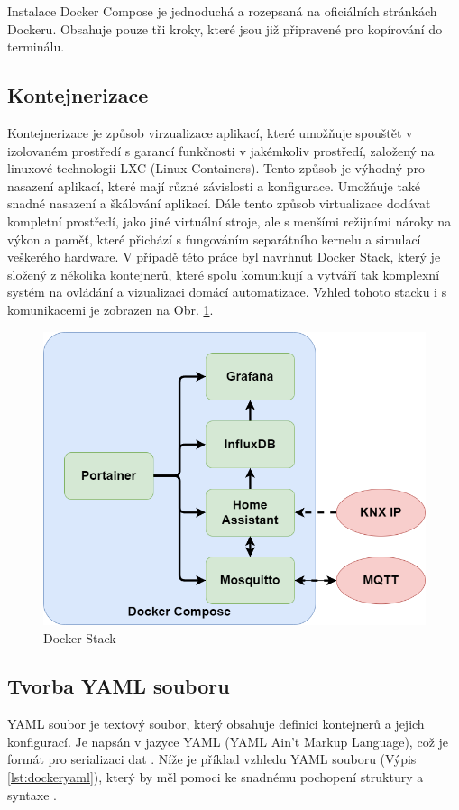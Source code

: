 Instalace Docker Compose je jednoduchá a rozepsaná na oficiálních stránkách Dockeru. Obsahuje pouze tři kroky, které jsou již připravené pro kopírování do terminálu. \cite{DockerInstallationForDebian}

\subsection{Kontejnerizace}
Kontejnerizace je způsob virzualizace aplikací, které umožňuje spouštět v izolovaném prostředí s garancí funkčnosti v jakémkoliv prostředí, založený na linuxové technologii LXC (Linux Containers). Tento způsob je výhodný pro nasazení aplikací, které mají různé závislosti a konfigurace. Umožňuje také snadné nasazení a škálování aplikací. Dále tento způsob virtualizace dodávat kompletní prostředí, jako jiné virtuální stroje, ale s menšími režijními nároky na výkon a paměť, které přichází s fungováním separátního kernelu a simulací veškerého hardware. \cite{ContainerAndVirtualization}
V případě této práce byl navrhnut Docker Stack, který je složený z několika kontejnerů, které spolu komunikují a vytváří tak komplexní systém na ovládání a vizualizaci domácí automatizace. Vzhled tohoto stacku i s komunikacemi je zobrazen na Obr. \ref{fig:DockerStack}.
\begin{figure}[!ht]
    \begin{center}
        \includegraphics[scale=0.30]{obrazky/stack.png}
    \end{center}
    \caption[Docker Stack]{Docker Stack }
    \label{fig:DockerStack}
\end{figure}
\subsection{Tvorba YAML souboru}
YAML soubor je textový soubor, který obsahuje definici kontejnerů a jejich konfigurací. Je napsán v jazyce YAML (YAML Ain't Markup Language), což je formát pro serializaci dat \cite{YAML}. Níže je příklad vzhledu YAML souboru (Výpis \ref{lst:dockeryaml}), který by měl pomoci ke snadnému pochopení struktury a syntaxe \cite{ComposeYamlExample}.

